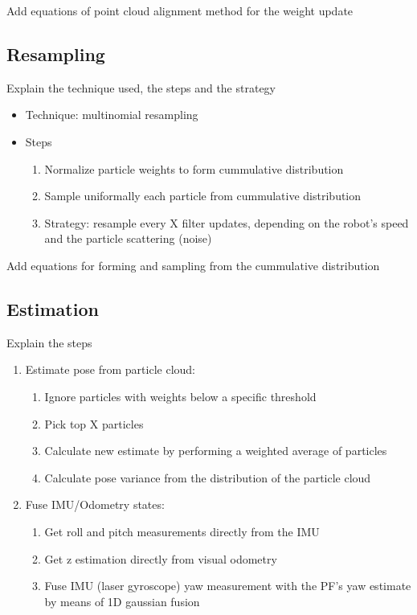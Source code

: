 \noindent
Add equations of point cloud alignment method for the weight update

\subsection{Resampling}

Explain the technique used, the steps and the strategy

\begin{itemize}
    \item Technique: multinomial resampling
    \item Steps
        \begin{enumerate}
            \item Normalize particle weights to form cummulative distribution
            \item Sample uniformally each particle from cummulative distribution
            \item Strategy: resample every X filter updates, depending on the robot's speed and the particle scattering (noise)
        \end{enumerate}
\end{itemize}

\noindent
Add equations for forming and sampling from the cummulative distribution

\subsection{Estimation}

Explain the steps

\begin{enumerate}
    \item Estimate pose from particle cloud:
        \begin{enumerate}
            \item Ignore particles with weights below a specific threshold
            \item Pick top X particles
            \item Calculate new estimate by performing a weighted average of particles
            \item Calculate pose variance from the distribution of the particle cloud
        \end{enumerate}
    \item Fuse IMU/Odometry states:
        \begin{enumerate}
            \item Get roll and pitch measurements directly from the IMU
            \item Get z estimation directly from visual odometry
            \item Fuse IMU (laser gyroscope) yaw measurement with the PF's yaw estimate by means of 1D gaussian fusion
        \end{enumerate}
\end{enumerate}

